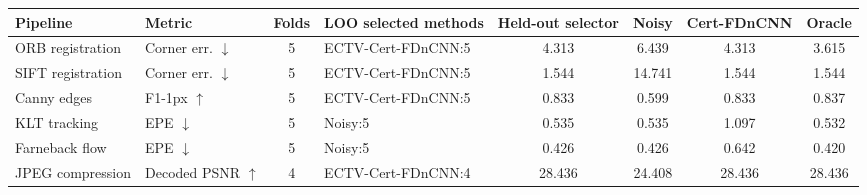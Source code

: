\begin{tabular}{lp{}cp{}cccc}
\toprule
Pipeline & Metric & Folds & LOO selected methods & Held-out selector & Noisy & Cert-FDnCNN & Oracle \\
\midrule
ORB registration & Corner err. $\downarrow$ & 5 & ECTV-Cert-FDnCNN:5 & 4.313 & 6.439 & 4.313 & 3.615 \\
SIFT registration & Corner err. $\downarrow$ & 5 & ECTV-Cert-FDnCNN:5 & 1.544 & 14.741 & 1.544 & 1.544 \\
Canny edges & F1-1px $\uparrow$ & 5 & ECTV-Cert-FDnCNN:5 & 0.833 & 0.599 & 0.833 & 0.837 \\
KLT tracking & EPE $\downarrow$ & 5 & Noisy:5 & 0.535 & 0.535 & 1.097 & 0.532 \\
Farneback flow & EPE $\downarrow$ & 5 & Noisy:5 & 0.426 & 0.426 & 0.642 & 0.420 \\
JPEG compression & Decoded PSNR $\uparrow$ & 4 & ECTV-Cert-FDnCNN:4 & 28.436 & 24.408 & 28.436 & 28.436 \\
\bottomrule
\end{tabular}
